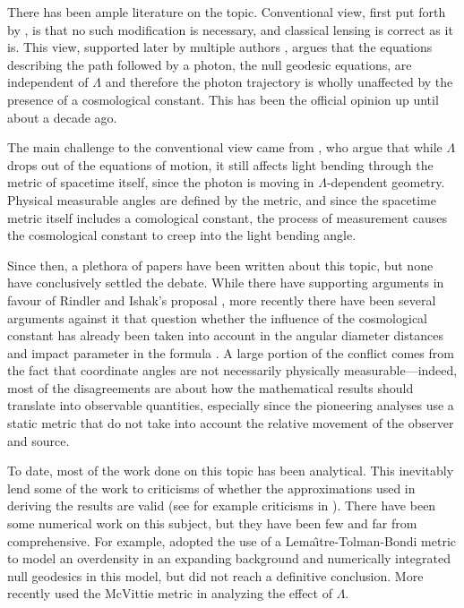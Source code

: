 There has been ample literature on the topic. Conventional view, first put forth by \citet{islam1983cosmological}, is that no such modification is necessary, and classical lensing is correct as it is. This view, supported later by multiple authors \citep{lake2002bending,park2008rigorous,simpson2010lensing,khriplovich2008does}, argues that the equations describing the path followed by a photon, the null geodesic equations, are independent of $\Lambda$ and therefore the photon trajectory is wholly unaffected by the presence of a cosmological constant. This has been the official opinion up until about a decade ago. 

The main challenge to the conventional view came from \citet{rindler2007contribution}, who argue that while $\Lambda$ drops out of the equations of motion, it still affects light bending through the metric of spacetime itself, since the photon is moving in $\Lambda$-dependent geometry. Physical measurable angles are defined by the metric, and since the spacetime metric itself includes a comological constant, the process of measurement causes the cosmological constant to creep into the light bending angle. 

Since then, a plethora of papers have been written about this topic, but none have conclusively settled the debate. While there have supporting arguments in favour of Rindler and Ishak's proposal \citep{sereno2008influence,schucker2008strong,bhadra2010gravitational}, more recently there have been several arguments against it that question whether the influence of the cosmological constant has already been taken into account in the angular diameter distances and impact parameter in the formula \citep{arakida2012effect,butcher2016no,piattella2016lensing}. A large portion of the conflict comes from the fact that coordinate angles are not necessarily physically measurable---indeed, most of the disagreements are about how the mathematical results should translate into observable quantities, especially since the pioneering analyses use a static metric that do not take into account the relative movement of the observer and source. 


To date, most of the work done on this topic has been analytical. This inevitably lend some of the work to criticisms of whether the approximations used in deriving the results are valid (see for example criticisms in \citet{ishak2010more}). There have been some numerical work on this subject, but they have been few and far from comprehensive. For example, \citet{beynon2012testing} adopted the use of a Lema{\^\i}tre-Tolman-Bondi metric to model an overdensity in an expanding background and numerically integrated null geodesics in this model, but did not reach a definitive conclusion. More recently \citep{aghili2017effect} used the McVittie metric \citep{mcvittie1933mass} in analyzing the effect of $\Lambda$. 


